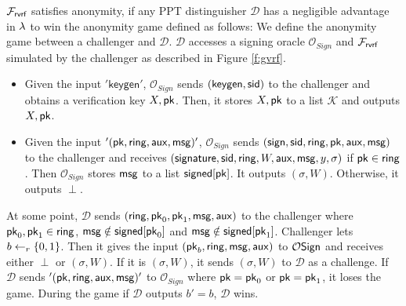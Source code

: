 \begin{definition}[Anonymity]\label{def:anonymity}
	$ \mathcal{F}_{\textsf{rvrf}} $ satisfies anonymity, if any PPT distinguisher $ \mathcal{D} $ has a negligible advantage in $ \lambda $ to win the anonymity game defined as follows:
	We define the anonymity game between a challenger and $ \mathcal{D} $.  $\mathcal{D}$ accesses a signing oracle $ \mathcal{O}_{Sign} $ and $ \mathcal{F}_{\textsf{rvrf}} $ simulated by the challenger as described in Figure \ref{f:gvrf}. 
	\begin{itemize}
		\item Given the input $ '\mathsf{keygen}' $, $\mathcal{O}_{Sign} $ sends $ (\mathsf{keygen, \textsf{sid}}) $ to the challenger and obtains a verification key $ X,\mathsf{pk} $. Then, it stores $ X,\mathsf{pk}  $ to a list $ \mathcal{K} $ and outputs $ X,\mathsf{pk} $.
		\item Given the input $ '(\mathsf{pk},\mathsf{ring},\mathsf{aux},\mathsf{msg})' $, $ \mathcal{O}_{Sign} $ sends $ (\mathsf{sign}, \textsf{sid},\mathsf{ring},\mathsf{pk}, \mathsf{aux}, \mathsf{msg}) $ to the challenger and receives $ (\mathsf{signature}, \textsf{sid}, \mathsf{ring}, W,\mathsf{aux}, \mathsf{msg}, y, \sigma) $ if $ \mathsf{pk} \in \mathsf{ring} $.  Then $ \mathcal{O}_{Sign} $ stores $ \mathsf{msg} $ to a list $ {\mathsf{signed}}[\mathsf{pk}]  $.
		It outputs $ (\sigma,W) $. Otherwise, it outputs $ \perp $.
	\end{itemize}
	At some point,	
	$ \mathcal{D} $ sends $ (\mathsf{ring}, \mathsf{pk}_0, \mathsf{pk}_1, \mathsf{msg},\mathsf{aux})$ to  the challenger where $ \mathsf{pk}_0, \mathsf{pk}_1 \in \mathsf{ring} $, $ \mathsf{msg}  \notin {\ensuremath{\mathsf{signed}}}[\mathsf{pk}_0]$ and $ \mathsf{msg}  \notin {\ensuremath{\mathsf{signed}}}[\mathsf{pk}_1] $.  Challenger lets $ b \leftarrow_r\{0,1\}$. Then it gives the input $ (\mathsf{pk}_b, \mathsf{ring}, \mathsf{msg},\mathsf{aux}) $ to $ \mathcal{O}\mathsf{Sign} $ and receives either $ \perp $ or $(\sigma,W)$. If it is $ (\sigma,W) $, it sends $ (\sigma,W) $ to $ \mathcal{D} $ as a challenge.
	If $ \mathcal{D} $ sends $ '(\mathsf{pk},\mathsf{ring},\mathsf{aux},\mathsf{msg})' $ to $ \mathcal{O}_{Sign} $ where $ \mathsf{pk} = \mathsf{pk}_0 $ or $ \mathsf{pk} = \mathsf{pk}_1 $, it loses the game. 
	During the game if $ \mathcal{D} $ outputs $ b' = b $, $ \mathcal{D} $ wins.
	
	
\end{definition}






%

